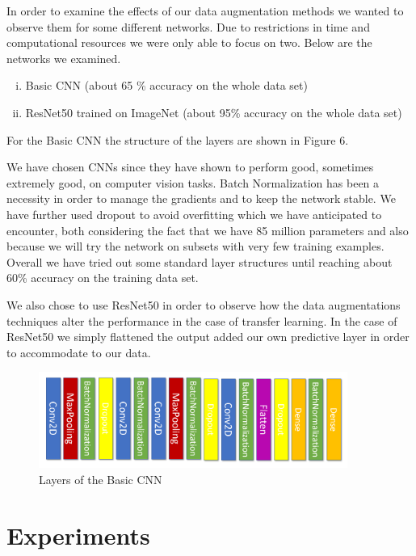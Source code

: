 \documentclass{article}
\begin{document}
In order to examine the effects of our data augmentation methods we wanted to observe them for some different networks. Due to restrictions in time and computational resources we were only able to focus on two. Below are the networks we examined.

\begin{enumerate}[(i)]
 \item Basic CNN (about 65 \% accuracy on the whole data set)
 \item ResNet50 trained on ImageNet (about 95\% accuracy on the whole data set)
\end{enumerate}

For the Basic CNN the structure of the layers are shown in Figure 6.

We have chosen CNNs since they have shown to perform good, sometimes extremely good, on computer vision tasks. Batch Normalization has been a necessity in order to manage the gradients and to keep the network stable. We have further used dropout to avoid overfitting which we have anticipated to encounter, both considering the fact that we have 85 million parameters and also because we will try the network on subsets with very few training examples. Overall we have tried out some standard layer structures until reaching about 60\% accuracy on the training data set.

We also chose to use ResNet50 in order to observe how the data augmentations techniques alter the performance in the case of transfer learning. In the case of ResNet50 we simply flattened the output added our own predictive layer in order to accommodate to our data.

\begin{figure}[H]
	\centering
	\includegraphics[width=0.9\textwidth]{conv.PNG}
	\caption{Layers of the Basic CNN}
\end{figure}


\section{Experiments}

% 
\end{document}
